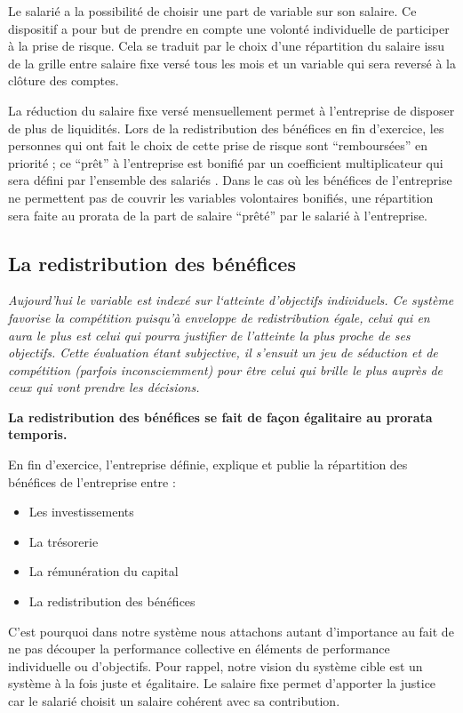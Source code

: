 \documentclass[12pt]{article}
\newcommand{\assemblee}[1]{%
  \begin{tcolorbox}[colframe=DarkPlum,boxrule=2pt,arc=4pt,left=6pt,right=6pt,top=6pt,bottom=6pt,boxsep=0pt,colback=white]
    \begin{tabular}{m{1cm} m{0.86\textwidth}}
      {\huge \faUsers} & #1 \\
    \end{tabular}
  \end{tcolorbox}
}
\newcommand{\actuel}[1]{%
  \begin{tcolorbox}[colframe=DarkButter,boxrule=2pt,arc=4pt,left=6pt,right=6pt,top=6pt,bottom=6pt,boxsep=0pt,colback=Aluminium2]
    \textit{#1}
  \end{tcolorbox}
}
\newcommand{\regle}[1]{%
  \begin{tcolorbox}[colframe=DarkOrange,boxrule=2pt,arc=4pt,left=6pt,right=6pt,top=6pt,bottom=6pt,boxsep=0pt,colback=LightOrange]
  \textbf{#1}
  \end{tcolorbox}
}
\begin{document}
 Le salarié a la possibilité de choisir une part de variable sur son salaire. Ce dispositif a pour but de prendre en compte une volonté individuelle de participer à la prise de risque. Cela se traduit par le choix d’une répartition du salaire issu de la grille entre salaire fixe versé tous les mois et un variable qui sera reversé à la clôture des comptes. 
 
 La réduction du salaire fixe versé mensuellement permet à l’entreprise de disposer de plus de liquidités. Lors de la redistribution des bénéfices en fin d’exercice, les personnes qui ont fait le choix de cette prise de risque sont “remboursées” en priorité ; ce “prêt” à l’entreprise est bonifié par un coefficient multiplicateur qui sera défini par l’ensemble des salariés \faUsers. Dans le cas où les bénéfices de l’entreprise ne permettent pas de couvrir les variables volontaires bonifiés, une répartition sera faite au prorata de la part de salaire “prêté” par le salarié à l’entreprise.

\subsection{La redistribution des bénéfices}
\actuel{Aujourd’hui le variable est indexé sur l‘atteinte d’objectifs individuels. Ce système favorise la compétition puisqu’à enveloppe de redistribution égale, celui qui en aura le plus est celui qui pourra justifier de l’atteinte la plus proche de ses objectifs. Cette évaluation étant subjective, il s'ensuit un jeu de séduction et de compétition (parfois inconsciemment) pour être celui qui brille le plus auprès de ceux qui vont prendre les décisions.}

\regle{La redistribution des bénéfices se fait de façon égalitaire au prorata temporis.}
 
 En fin d’exercice, l’entreprise définie, explique et publie la répartition des bénéfices de l’entreprise entre :
 \begin{itemize}
   \item Les investissements
   \item La trésorerie
   \item La rémunération du capital
   \item La redistribution des bénéfices
 \end{itemize}

 C’est pourquoi dans notre système nous attachons autant d’importance au fait de ne pas découper la performance collective en éléments de performance individuelle ou d'objectifs. Pour rappel, notre vision du système cible est un système à la fois juste et égalitaire. Le salaire fixe permet d’apporter la justice car le salarié choisit un salaire cohérent avec sa contribution. 
\end{document}
